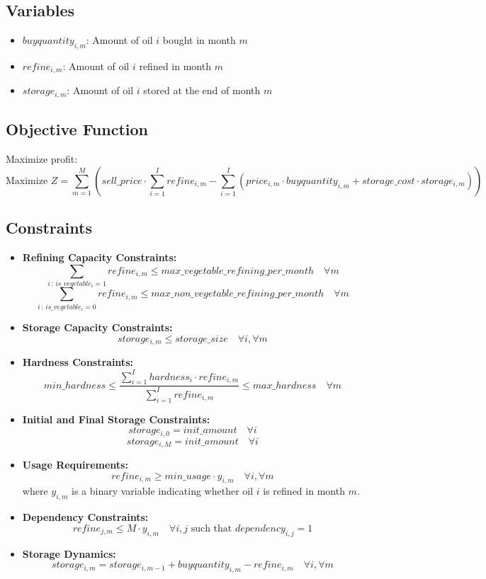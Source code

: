 \documentclass{article}
\begin{document}
\subsection*{Variables}
\begin{itemize}
    \item $buyquantity_{i,m}$: Amount of oil $i$ bought in month $m$
    \item $refine_{i,m}$: Amount of oil $i$ refined in month $m$
    \item $storage_{i,m}$: Amount of oil $i$ stored at the end of month $m$
\end{itemize}

\subsection*{Objective Function}
Maximize profit:
\[
\text{Maximize } Z = \sum_{m=1}^{M} \left( sell\_price \cdot \sum_{i=1}^{I} refine_{i,m} - \sum_{i=1}^{I} (price_{i,m} \cdot buyquantity_{i,m} + storage\_cost \cdot storage_{i,m}) \right)
\]

\subsection*{Constraints}
\begin{itemize}
    \item \textbf{Refining Capacity Constraints:}
    \[
    \sum_{i \, : \, is\_vegetable_{i}=1} refine_{i,m} \leq max\_vegetable\_refining\_per\_month \quad \forall m
    \]
    \[
    \sum_{i \, : \, is\_vegetable_{i}=0} refine_{i,m} \leq max\_non\_vegetable\_refining\_per\_month \quad \forall m
    \]
    
    \item \textbf{Storage Capacity Constraints:}
    \[
    storage_{i,m} \leq storage\_size \quad \forall i, \forall m
    \]
    
    \item \textbf{Hardness Constraints:}
    \[
    min\_hardness \leq \frac{\sum_{i=1}^{I} hardness_{i} \cdot refine_{i,m}}{\sum_{i=1}^{I} refine_{i,m}} \leq max\_hardness \quad \forall m
    \]

    \item \textbf{Initial and Final Storage Constraints:}
    \[
    storage_{i,0} = init\_amount \quad \forall i
    \]
    \[
    storage_{i,M} = init\_amount \quad \forall i
    \]

    \item \textbf{Usage Requirements:}
    \[
    refine_{i,m} \geq min\_usage \cdot y_{i,m} \quad \forall i, \forall m
    \]
    where \( y_{i,m} \) is a binary variable indicating whether oil \( i \) is refined in month \( m \).

    \item \textbf{Dependency Constraints:}
    \[
    refine_{j,m} \leq M \cdot y_{i,m} \quad \forall i, j \text{ such that } dependency_{i,j} = 1
    \]

    \item \textbf{Storage Dynamics:}
    \[
    storage_{i,m} = storage_{i,m-1} + buyquantity_{i,m} - refine_{i,m} \quad \forall i, \forall m
    \]
\end{itemize}
\end{document}
